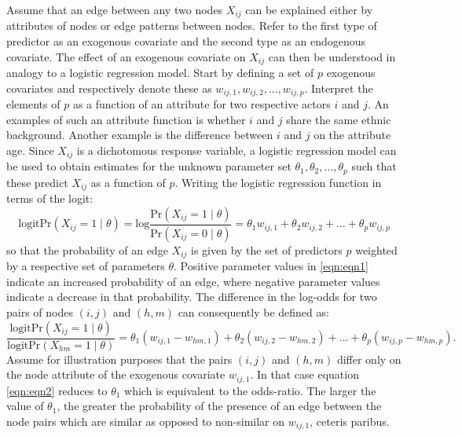 \documentclass[a4paper, man]{apa6}
\begin{document}
Assume that an edge between any two nodes $X_{ij}$ can be explained either by attributes of nodes or edge patterns between nodes. Refer to the first type of predictor as an exogenous covariate and the second type as an endogenous covariate. The effect of an exogenous covariate on $X_{ij}$ can then be understood in analogy to a logistic regression model. Start by defining a set of $p$ exogenous covariates and respectively denote these as $w_{ij,1}, w_{ij,2}, ..., w_{ij,p}$. Interpret the elements of $p$ as a function of an attribute for two respective actors $i$ and $j$. An examples of such an attribute function is whether $i$ and $j$ share the same ethnic background. Another example is the difference between $i$ and $j$ on the attribute age. Since $X_{ij}$ is a dichotomous response variable, a logistic regression model can be used to obtain estimates for the unknown parameter set $\theta_{1}, \theta_{2}, ..., \theta_{p}$ such that these predict $X_{ij}$ as a function of $p$. Writing the logistic regression function in terms of the logit: \begin{equation} \label{eqn:eqn1} \text{logitPr}(X_{ij} = 1 \mid \theta) = \text{log}\frac{\text{Pr}(X_{ij} = 1 \mid \theta)}{\text{Pr}(X_{ij} = 0 \mid \theta)} = \theta_{1}w_{ij,1} + \theta_{2}w_{ij,2} + ... + \theta_{p}w_{ij, p} \end{equation} so that the probability of an edge $X_{ij}$ is given by the set of  predictors $p$ weighted by a respective set of parameters $\theta$. Positive parameter values in \eqref{eqn:eqn1} indicate an increased probability of an edge, where negative parameter values indicate a decrease in that probability. The difference in the log-odds for two pairs of nodes $(i, j)$ and $(h, m)$ can consequently be defined as: \begin{equation} \label{eqn:eqn2} \frac{\text{logitPr}(X_{ij} = 1 \mid \theta)}{\text{logitPr}(X_{hm} = 1 \mid \theta)} = \theta_{1}(w_{ij,1} - w_{hm,1}) + \theta_{2}(w_{ij,2} - w_{hm,2}) + ... + \theta_{p}(w_{ij, p} - w_{hm, p}).\end{equation} \clearpage \noindent Assume for illustration purposes that the pairs $(i, j)$ and $(h, m)$ differ only on the node attribute of the exogenous covariate $w_{ij,1}$. In that case equation \eqref{eqn:eqn2} reduces to $\theta_{1}$ which is equivalent to the odds-ratio. The larger the value of $\theta_{1}$, the greater the probability of the presence of an edge between the node pairs which are similar as opposed to non-similar on $w_{ij, 1}$, ceteris paribus.
\\
\end{document}
